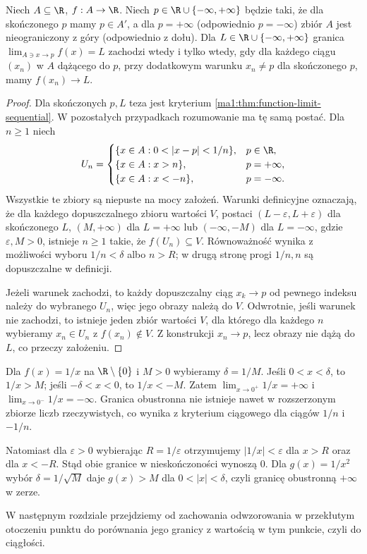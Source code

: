 \begin{twierdzenie}
\label{ma1:thm:extended-limits-sequential}
Niech $A\subseteq\R$, $f:A\to\R$. Niech $p\in\R\cup\{-\infty,+\infty\}$ będzie taki, że dla skończonego $p$ mamy $p\in A'$, a dla $p=+\infty$ (odpowiednio $p=-\infty$) zbiór $A$ jest nieograniczony z góry (odpowiednio z dołu). Dla $L\in\R\cup\{-\infty,+\infty\}$ granica $\lim_{A\ni x\to p}f(x)=L$ zachodzi wtedy i tylko wtedy, gdy dla każdego ciągu $(x_n)$ w $A$ dążącego do $p$, przy dodatkowym warunku $x_n\ne p$ dla skończonego $p$, mamy $f(x_n)\to L$.
\end{twierdzenie}
\begin{proof}
Dla skończonych $p,L$ teza jest kryterium \ref{ma1:thm:function-limit-sequential}. W pozostałych przypadkach rozumowanie ma tę samą postać. Dla $n\ge1$ niech
\[
 U_n=\begin{cases}
 \{x\in A:0<|x-p|<1/n\}, &p\in\R,\\
 \{x\in A:x>n\}, &p=+\infty,\\
 \{x\in A:x<-n\}, &p=-\infty.
 \end{cases}
\]
Wszystkie te zbiory są niepuste na mocy założeń. Warunki definicyjne oznaczają, że dla każdego dopuszczalnego zbioru wartości $V$, postaci $(L-\varepsilon,L+\varepsilon)$ dla skończonego $L$, $(M,+\infty)$ dla $L=+\infty$ lub $(-\infty,-M)$ dla $L=-\infty$, gdzie $\varepsilon,M>0$, istnieje $n\ge1$ takie, że $f(U_n)\subseteq V$. Równoważność wynika z możliwości wyboru $1/n<\delta$ albo $n>R$; w drugą stronę progi $1/n,n$ są dopuszczalne w definicji.

Jeżeli warunek zachodzi, to każdy dopuszczalny ciąg $x_k\to p$ od pewnego indeksu należy do wybranego $U_n$, więc jego obrazy należą do $V$. Odwrotnie, jeśli warunek nie zachodzi, to istnieje jeden zbiór wartości $V$, dla którego dla każdego $n$ wybieramy $x_n\in U_n$ z $f(x_n)\notin V$. Z konstrukcji $x_n\to p$, lecz obrazy nie dążą do $L$, co przeczy założeniu.
\end{proof}
\begin{przyklad}
\label{ma1:ex:extended-limits}
Dla $f(x)=1/x$ na $\R\setminus\{0\}$ i $M>0$ wybieramy $\delta=1/M$. Jeśli $0<x<\delta$, to $1/x>M$; jeśli $-\delta<x<0$, to $1/x<-M$. Zatem $\lim_{x\to0^+}1/x=+\infty$ i $\lim_{x\to0^-}1/x=-\infty$. Granica obustronna nie istnieje nawet w rozszerzonym zbiorze liczb rzeczywistych, co wynika z kryterium ciągowego dla ciągów $1/n$ i $-1/n$.

Natomiast dla $\varepsilon>0$ wybierając $R=1/\varepsilon$ otrzymujemy $|1/x|<\varepsilon$ dla $x>R$ oraz dla $x<-R$. Stąd obie granice w nieskończoności wynoszą $0$. Dla $g(x)=1/x^2$ wybór $\delta=1/\sqrt M$ daje $g(x)>M$ dla $0<|x|<\delta$, czyli granicę obustronną $+\infty$ w zerze.
\end{przyklad}

W następnym rozdziale przejdziemy od zachowania odwzorowania w przekłutym otoczeniu punktu do porównania jego granicy z wartością w tym punkcie, czyli do ciągłości.
